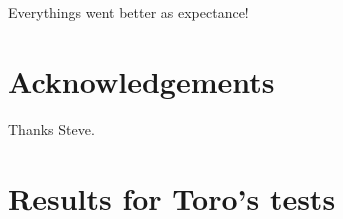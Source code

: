 \documentclass[final,3p,twocolumn]{elsarticle}
\begin{document}
Everythings went better as expectance!

\section*{Acknowledgements}
\label{sec:acknowledgements}
Thanks Steve. 




\clearpage
\appendix
\section{Results for Toro's tests}
\label{app:toro}

%
%
%
\end{document}
